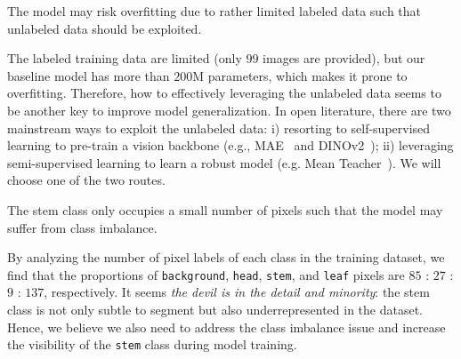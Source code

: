 \begin{remark}
    The model may risk overfitting due to rather limited labeled data such that unlabeled data should be exploited.
\end{remark}
The labeled training data are limited (only $99$ images are provided), but our baseline model has more than $200$M parameters, which makes it prone to overfitting. Therefore, how to effectively leveraging the unlabeled data seems to be another key to improve model generalization. In open literature, there are two mainstream ways to exploit the unlabeled data: i) resorting to self-supervised learning to pre-train a vision backbone (e.g., MAE~\cite{he2022masked} and DINOv2~\cite{oquab2023dinov2}); ii) leveraging semi-supervised learning to learn a robust model (e.g. Mean Teacher~\cite{tarvainen2017mean}). We will choose one of the two routes. 

\begin{remark}
    The stem class only occupies a small number of pixels such that the model may suffer from class imbalance.
\end{remark}
By analyzing the number of pixel labels of each class in the training dataset, we find that the proportions of \texttt{background}, \texttt{head}, \texttt{stem}, and \texttt{leaf} pixels are $85$ : $27$ : $9$ : $137$, respectively. It seems \textit{the devil is in the detail and minority}: the stem class is not only subtle to segment but also underrepresented in the dataset. %
Hence, we believe we also need to address the class imbalance issue and increase the visibility of the \texttt{stem} class during model training. %

